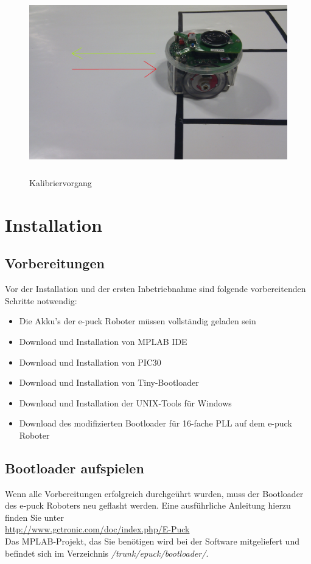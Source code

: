 \documentclass[10pt,a4paper]{article}
\let\oldsection\section
\renewcommand{\section}{\newpage \oldsection}
\begin{document}
		\vspace{30pt}
		 \begin{figure}[htbp]
			\includegraphics[height=8cm]{images/puck3.png} 
			\caption{Kalibriervorgang}
			\label{kalibrierabbildung}
		\end{figure}
\section{Installation}
			\subsection{Vorbereitungen} 
			Vor der Installation und der ersten Inbetriebnahme sind folgende vorbereitenden Schritte notwendig:
			\begin{itemize}
				\item{Die Akku's der e-puck Roboter m\"ussen vollst\"andig geladen sein}
				\item{Download und Installation von MPLAB IDE}
				\item{Download und Installation von PIC30}
				\item{Download und Installation von Tiny-Bootloader}
				\item{Download und Installation der UNIX-Tools f\"ur Windows}
				\item{Download des modifizierten Bootloader f\"ur 16-fache PLL auf dem e-puck Roboter}
			\end{itemize}
			\subsection{Bootloader aufspielen} 
				Wenn alle Vorbereitungen erfolgreich durchge\"uhrt wurden, muss der Bootloader des e-puck Roboters neu geflasht werden. Eine ausf\"uhrliche
				Anleitung hierzu finden Sie unter \\ \url{http://www.gctronic.com/doc/index.php/E-Puck} \\
				Das MPLAB-Projekt, das Sie ben\"otigen wird bei der Software mitgeliefert und befindet sich im Verzeichnis \textit{/trunk/epuck/bootloader/}.
\end{document}
